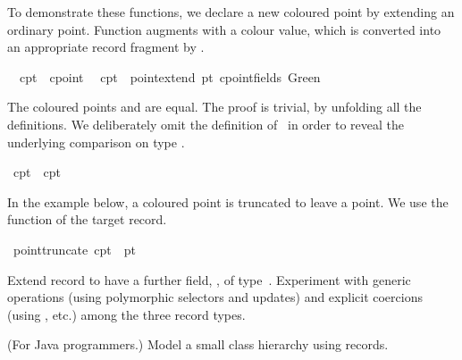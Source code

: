 \begin{isabellebody}
\begin{isamarkuptext}
  To demonstrate these functions, we declare a new coloured point by
  extending an ordinary point.  Function  augments
   with a colour value, which is converted into an
  appropriate record fragment by .%
\end{isamarkuptext}%
\isamarkuptrue%
\isanewline
\ \ cpt{}\ {\isacharcolon}{\isacharcolon}\ cpoint\isanewline
\ \ {\isachardoublequote}cpt{}\ {\isasymequiv}\ point{\isachardot}extend\ pt{}\ {\isacharparenleft}cpoint{\isachardot}fields\ Green{\isacharparenright}{\isachardoublequote}\isamarkupfalse%
%
\begin{isamarkuptext}%
The coloured points  and  are equal.  The
  proof is trivial, by unfolding all the definitions.  We deliberately
  omit the definition of~ in order to reveal the underlying
  comparison on type .%
\end{isamarkuptext}%
\isamarkuptrue%
\ {\isachardoublequote}cpt{}\ {\isacharequal}\ cpt{}{\isachardoublequote}\isanewline
\ \ \isamarkupfalse%
\isamarkupfalse%
\isamarkuptrue%
\isamarkupfalse%
\isamarkupfalse%
%
\begin{isamarkuptext}%
In the example below, a coloured point is truncated to leave a
  point.  We use the  function of the target record.%
\end{isamarkuptext}%
\isamarkuptrue%
\ {\isachardoublequote}point{\isachardot}truncate\ cpt{}\ {\isacharequal}\ pt{}{\isachardoublequote}\isanewline
\ \ \isamarkupfalse%
\isamarkupfalse%
%
\begin{isamarkuptext}%
\begin{exercise}
  Extend record  to have a further field, , of type~.  Experiment with generic operations
  (using polymorphic selectors and updates) and explicit coercions
  (using ,  etc.) among the three record
  types.
  \end{exercise}

  \begin{exercise}
  (For Java programmers.)
  Model a small class hierarchy using records.
  \end{exercise}
\end{isamarkuptext}%
\isamarkuptrue%
\isamarkupfalse%
\end{isabellebody}%
